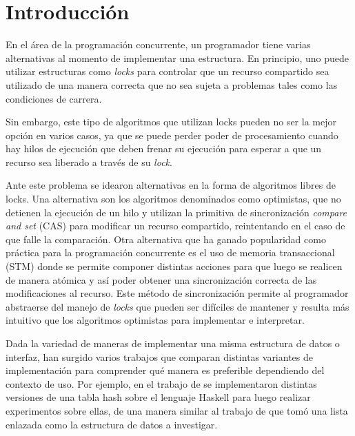 \chapter{Introducción}

En el área de la programación concurrente, un programador tiene varias alternativas al momento de implementar una estructura. En principio, uno puede utilizar estructuras como \emph{locks} para controlar que un recurso compartido sea utilizado de una manera correcta que no sea sujeta a problemas tales como las condiciones de carrera.

Sin embargo, este tipo de algoritmos que utilizan locks pueden no ser la mejor opción en varios casos, ya que se puede perder poder de procesamiento cuando hay hilos de ejecución que deben frenar su ejecución para esperar a que un recurso sea liberado a través de su \emph{lock}.

Ante este problema se idearon alternativas en la forma de algoritmos libres de locks. Una alternativa son los algoritmos denominados como optimistas, que no detienen la ejecución de un hilo y utilizan la primitiva de sincronización \emph{compare and set} (CAS) \cite{cas} para modificar un recurso compartido, reintentando en el caso de que falle la comparación. Otra alternativa que ha ganado popularidad como práctica para la programación concurrente es el uso de memoria transaccional (STM) \cite{stm} donde se permite componer distintas acciones para que luego se realicen de manera atómica y así poder obtener una sincronización correcta de las modificaciones al recurso.
Este método de sincronización permite al programador abstraerse del manejo de \emph{locks} que pueden ser difíciles de mantener y resulta más intuitivo que los algoritmos optimistas para implementar e interpretar.

Dada la variedad de maneras de implementar una misma estructura de datos o interfaz, han surgido varios trabajos que  comparan distintas variantes de implementación para comprender qué manera es preferible dependiendo del contexto de uso. Por ejemplo, en el trabajo de \cite{hash} se implementaron distintas versiones de una tabla hash sobre el lenguaje Haskell para luego realizar experimentos sobre ellas, de una manera similar al trabajo de \cite{linked-list} que tomó una lista enlazada como la estructura de datos a investigar.

